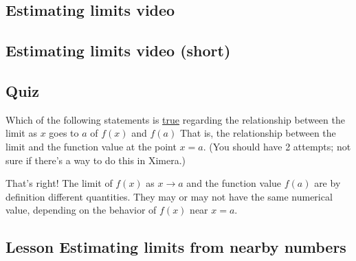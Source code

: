 \documentclass{ximera}
\begin{document}
\subsection{Estimating limits video}
\begin{center}
\end{center}

\subsection{Estimating limits video (short)}

\begin{center}
\end{center}

\subsection{Quiz}

\begin{question}  
Which of the following statements is \underline{true} regarding the relationship between the limit as $x$ goes to $a$ of $f(x)$ and $f(a)$  That is, the relationship between the limit and the function value at the point $x=a$. (You should have 2 attempts; not sure if there's a way to do this in Ximera.)
\begin{multipleChoice}  
\end{multipleChoice}  

\begin{explanation}
    That's right! The limit of $f(x)$ as $x \to a$ and the function value $f(a)$ are by definition different quantities. They may or may not have the same numerical value, depending on the behavior of $f(x)$ near $x=a$.
\end{explanation}
\end{question}

\subsection{Lesson Estimating limits from nearby numbers}
\begin{center}
\end{center}
\end{document}
